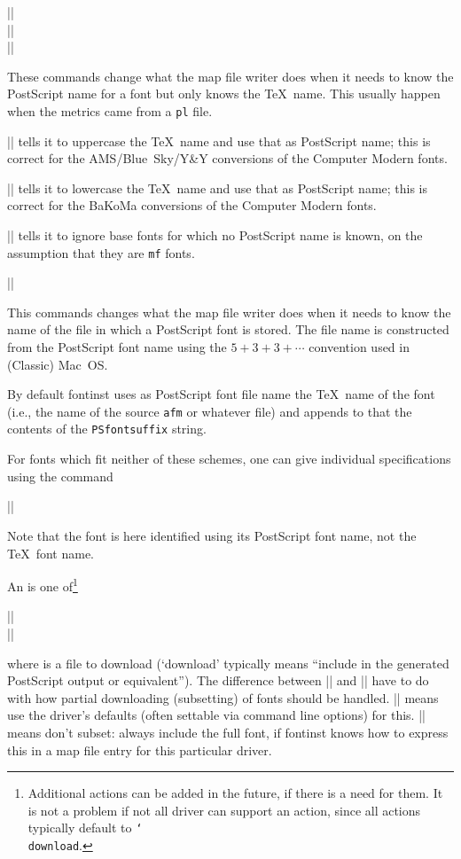 \documentclass[a4paper]{ltxguide}
\makeatletter
\newenvironment{decl*}[1][]{%
   \par
   \small
   \addvspace{2.3ex}%
   \vskip -\parskip
   \ifx\relax#1\relax
      \def\@decl@date{}%
   \else
      \def\@decl@date{\NEWfeature{#1}}%
   \fi
   \noindent\hspace{-\leftmargini}%
   \begin{tabular}{|l|}%
      \hline\ignorespaces
}{%
      \\\hline
   \end{tabular}%
   \nobreak\@decl@date\par\nobreak
   \vspace{2.3ex}\vskip -\parskip
}
\newcommand*{\meta}{\m}
\newcommand*{\marg}{\arg}
\newcommand*{\cs}[1]{\texttt{\char`\\ #1}\xspace}
\newcommand{\PS}{Post\-Script\xspace}
\newcommand*{\setfilename}[1]{\texttt{#1}}
\newcommand*{\setpackagename}[1]{\textsf{#1}}
\newcommand{\fontinst}{\setpackagename{font\-inst}\xspace}
\newcommand{\mf} {\setfilename{mf}\xspace}
\newcommand{\pl} {\setfilename{pl}\xspace}
\newcommand{\afm}{\setfilename{afm}\xspace}
\makeatother
\begin{document}
\begin{decl}
  |\AssumeAMSBSYY|\\
  |\AssumeBaKoMa|\\
  |\AssumeMetafont|
\end{decl}
These commands change what the map file writer does when it needs to 
know the \PS name for a font but only knows the \TeX\ name. This 
usually happen when the metrics came from a \pl file.

|\AssumeAMSBSYY| tells it to uppercase the \TeX\ name and use that as 
\PS name; this is correct for the AMS\slash Blue~Sky\slash Y\&Y 
conversions of the Computer Modern fonts.

|\AssumeBaKoMa| tells it to lowercase the \TeX\ name and use that as 
\PS name; this is correct for the BaKoMa conversions of the Computer 
Modern fonts.

|\AssumeMetafont| tells it to ignore base fonts for which no \PS name 
is known, on the assumption that they are \mf fonts.


\begin{decl}
  |\AssumeLWFN|
\end{decl}
This commands changes what the map file writer does when it needs to 
know the name of the file in which a \PS font is stored. The file name 
is constructed from the \PS font name using the $5+3+3+\cdots$ 
convention used in (Classic) Mac~OS.

By default \fontinst uses as \PS font file name the \TeX\ name of the 
font (i.e., the name of the source \afm or whatever file) and appends 
to that the contents of the \texttt{PSfontsuffix} string.

For fonts which fit neither of these schemes, one can give individual 
specifications using the command
\begin{decl*}
  |\specifypsfont|\marg{PS font name}\marg{actions}
\end{decl*}
Note that the font is here identified using its \PS font name, not the 
\TeX\ font name.

An \meta{action} is one of\footnote{Additional actions can be added 
in the future, if there is a need for them. It is not a problem if not 
all driver can support an action, since all actions typically default 
to \cs{download}.}
\begin{decl*}[v1.928]
  |\download|\marg{file}\\
  |\fulldownload|\marg{file}
\end{decl*}
where \meta{file} is a file to download (`download' typically means 
``include in the generated \PS output or equivalent''). The difference 
between |\download| and |\fulldownload| have to do with how partial 
downloading (subsetting) of fonts should be handled. |\download| means 
use the driver's defaults (often settable via command line options) 
for this. |\fulldownload| means don't subset: always include the full 
font, if \fontinst knows how to express this in a map file entry for 
this particular driver.
\end{document}
